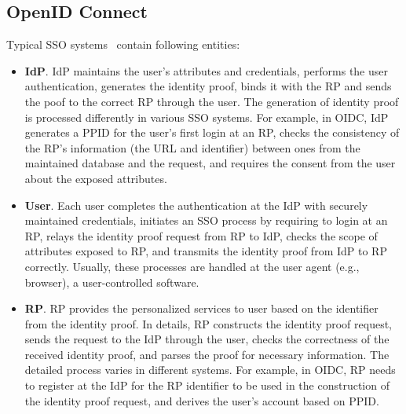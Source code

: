 \subsection{OpenID Connect}
\label{subsec:OIDC}
Typical SSO systems~\cite{SAMLIdentifier,OpenIDConnect,SPRESSO} contain following entities:
\begin{itemize}
    \item \textbf{IdP}. IdP maintains the user's attributes and credentials, performs the user authentication, generates the identity proof, binds it with the RP
    and sends the poof  to the correct RP through the user.
    The generation of identity proof is processed differently in various SSO systems.
    For example, in OIDC, IdP generates a PPID for the user's first login at an RP,
    checks the consistency of the RP's information (the URL and identifier) between ones from the maintained database and the request,
    and requires the  consent from the user about the exposed attributes.

     \item \textbf{User}. Each user completes the authentication at the IdP with securely maintained credentials,
     initiates an SSO process by requiring to login at an RP,
     relays the identity proof request from RP to IdP,
     checks the scope of attributes exposed to RP,
     and transmits the identity proof from IdP to RP correctly.
     Usually, these processes are handled at the user agent (e.g., browser),  a user-controlled software. %

    \item \textbf{RP}. RP provides the personalized services to user based on the identifier from the identity proof.
    In details, RP constructs the identity proof request, sends the request to the IdP through the user, checks the correctness of the received identity proof,
    and parses the proof for necessary information.
    The detailed process varies in different systems.
     For example, in OIDC, RP needs to register at the IdP for the RP identifier to be used in the construction of the identity proof request,
     and derives the user's account based on PPID.
\end{itemize}
